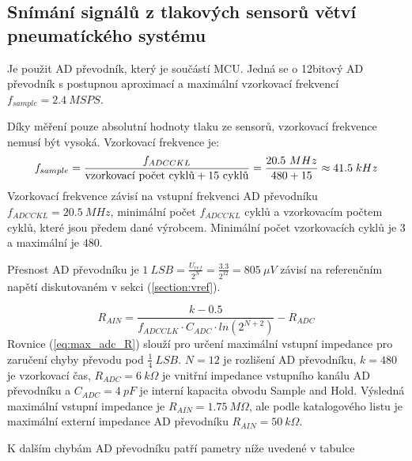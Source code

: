 \subsection{Snímání signálů z tlakových sensorů větví pneumatíckého systému}
Je použit AD převodník, který je součástí MCU. Jedná se o 12bitový AD převodník s postupnou aproximací a maximální vzorkovací frekvencí $f_{sample} = 2.4 \ MSPS$. \par
Díky měření pouze absolutní hodnoty tlaku ze sensorů, vzorkovací frekvence nemusí být vysoká. Vzorkovací frekvence je:
\begin{equation}
    f_{sample}=\frac{f_{ADCCKL}}{\textnormal{vzorkovací počet cyklů} + 15 \ \textnormal{cyklů} } = \frac{20.5 \ MHz}{480 + 15} \approx 41.5 \; kHz
\end{equation}
Vzorkovací frekvence závisí na vstupní frekvenci AD převodníku $f_{ADCCKL} = 20.5 \ MHz$, minimální počet $f_{ADCCKL} $ cyklů a vzorkovacím počtem cyklů, které jsou předem dané výrobcem. Minimální počet vzorkovacích cyklů je $3$ a maximální je $480$.
\par
Přesnost AD převodníku je $1 \ LSB = \frac{U_{ref}}{2^N} = \frac{3.3}{2^{12}} = 805 \ \mu V$ závisí na referenčním napětí diskutovaném v sekci (\ref{section:vref}).

\begin{equation} \label{eq:max_adc_R}
    R_{AIN} = \frac{k - 0.5}{f_{ADCCLK} \cdot C_{ADC} \cdot ln(2^{N+2})} - R_{ADC}
\end{equation}
Rovnice (\ref{eq:max_adc_R}) slouží pro určení maximální vstupní impedance pro zaručení chyby převodu pod $\frac{1}{4} \ LSB$. $N = 12$ je rozlišení AD převodníku, $k = 480$ je vzorkovací čas, $R_{ADC} = 6 \ k\Omega$ je vnitřní impedance vstupního kanálu AD převodníku a
$C_{ADC} = 4 \ pF$ je interní kapacita obvodu Sample and Hold. Výsledná maximální vstupní impedance je $R_{AIN} = 1.75 \ M\Omega$, ale podle katalogového listu je maximální externí impedance AD převodníku $R_{AIN} = 50 \ k\Omega$.
\par
K dalším chybám AD převodníku patří pametry níže uvedené v tabulce

